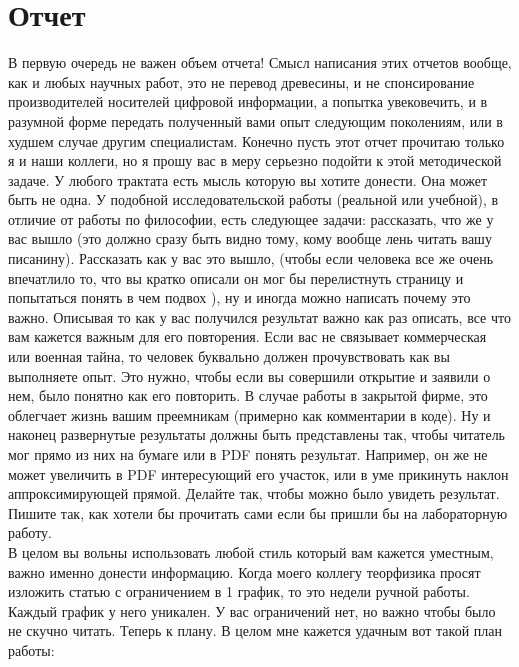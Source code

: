 \documentclass[a4paper,12pt]{article} %
\begin{document}
\section{Отчет}
В первую очередь не важен объем отчета! Смысл написания этих отчетов вообще, как и любых научных работ, это не перевод древесины, и не спонсирование производителей носителей цифровой информации, а попытка увековечить, и в разумной форме передать полученный вами опыт следующим поколениям, или в худшем случае другим специалистам. Конечно пусть этот отчет прочитаю только я и наши коллеги, но я прошу вас в меру серьезно подойти к этой методической задаче. У любого трактата есть мысль которую вы хотите донести. Она может быть не одна. У подобной исследовательской работы (реальной или учебной), в отличие от работы по философии, есть следующее задачи: рассказать, что же у вас вышло (это должно сразу быть видно тому, кому вообще лень читать вашу писанину). Рассказать как у вас это вышло,  (чтобы если человека все же очень впечатлило то, что вы кратко описали он мог бы перелистнуть страницу и попытаться понять в чем подвох ), ну и иногда можно написать почему это важно. Описывая то как у вас получился результат важно как раз описать, все что вам кажется важным для его повторения. Если вас не связывает коммерческая или военная тайна, то человек буквально должен прочувствовать как вы выполняете опыт. Это нужно, чтобы если вы совершили открытие и заявили о нем, было понятно как его повторить. В случае работы в закрытой фирме,  это облегчает жизнь вашим преемникам (примерно как комментарии в коде). Ну и наконец развернутые результаты должны быть представлены так, чтобы читатель мог прямо из них на бумаге или в PDF понять результат. Например, он же не может увеличить в PDF интересующий его участок, или в уме прикинуть наклон аппроксимирующей прямой. Делайте так, чтобы можно было увидеть результат. Пишите так, как хотели бы прочитать сами если бы пришли бы на лабораторную работу.\\
В целом вы вольны использовать любой стиль который вам кажется уместным, важно именно донести информацию. Когда моего коллегу теорфизика просят изложить статью с ограничением в 1 график, то это недели ручной работы. Каждый график у него уникален. У вас ограничений нет, но важно чтобы было не скучно читать. Теперь к плану.
В целом мне кажется удачным вот такой план работы:
\end{document}
